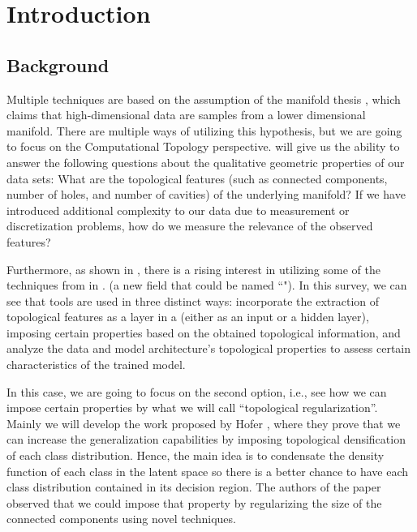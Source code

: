 \documentclass[../main.tex]{subfiles}
\begin{document}
\chapter{Introduction}
\label{ch:introduction}


\section{Background}
\label{sec:background}


Multiple  techniques are based on the assumption of the manifold thesis \cite{fefferman_testing_2016}, which claims that high-dimensional data are samples from a lower dimensional manifold. There are multiple ways of utilizing this hypothesis, but we are going to focus on the Computational Topology perspective.  will give us the ability to answer the following questions about the qualitative geometric properties of our data sets: What are the topological features (such as connected components, number of holes, and number of cavities) of the underlying manifold? If we have introduced additional complexity to our data due to measurement or discretization problems, how do we measure the relevance of the observed features? 


Furthermore, as shown in \cite{hensel_survey_2021}, there is a rising interest in utilizing some of the techniques from  in . (a new field that could be named “"). In this survey, we can see that  tools are used in three distinct ways: incorporate the extraction of topological features as a layer in a  (either as an input or a hidden layer), imposing certain properties based on the obtained topological information, and analyze the data and model architecture's topological properties to assess certain characteristics of the trained model.  

In this case, we are going to focus on the second option, i.e., see how we can impose certain properties by what we will call ``topological regularization''. Mainly we will develop the work proposed by Hofer \etal \cite{hofer_densified_2021}, where they prove that we can increase the generalization capabilities by imposing topological densification of each class distribution. Hence, the main idea is to condensate the density function of each class in the latent space so there is a better chance to have each class distribution contained in its decision region. The authors of the paper observed that we could impose that property by regularizing the size of the connected components using novel  techniques.\\
\end{document}
